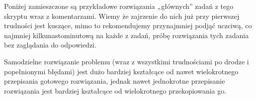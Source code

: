 \noindent
Poniżej zamieszczone są przykładowe rozwiązania „głównych” zadań z tego skryptu wraz z komentarzami.
Wiemy że zajrzenie do nich już przy pierwszej trudności jest kuszące, mimo to rekomendujemy przynajmniej podjąć uczciwą, co najmniej kilkunastominutową na każde z zadań, próbę rozwiązania tych zadania bez zaglądania do odpowiedzi.

\vspace{7pt}\noindent
{} Samodzielne rozwiązanie problemu (wraz z wszystkimi trudnościami po drodze i popełnionymi błędami) jest dużo bardziej kształcące od nawet wielokrotnego przepisania gotowego rozwiązania, jednak nawet jednokrotne przepisanie rozwiązania jest bardziej kształcące od wielokrotnego przekopiowania go.
